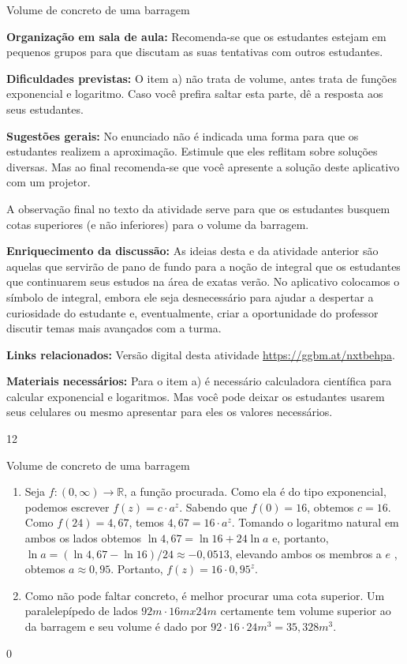 \begin{sugestions}{Volume de concreto de uma barragem}
{
\textbf{Organização em sala de aula:} Recomenda-se que os estudantes estejam em pequenos grupos para que discutam as suas tentativas com outros estudantes.

\textbf{Dificuldades previstas:} O item a) não trata de volume, antes trata de funções exponencial e logaritmo. Caso você prefira saltar esta parte, dê a resposta aos seus estudantes.

\textbf{Sugestões gerais:} No enunciado não é indicada uma forma para que os estudantes realizem a aproximação. Estimule que eles reflitam sobre soluções diversas. Mas ao final recomenda-se que você apresente a solução deste aplicativo com um projetor.

A observação final no texto da atividade serve para que os estudantes busquem cotas superiores (e não inferiores) para o volume da barragem.

\textbf{Enriquecimento da discussão:} As ideias desta e da atividade anterior são aquelas que servirão de pano de fundo para a noção de integral que os estudantes que continuarem seus estudos na área de exatas verão. No aplicativo colocamos o símbolo de integral, embora ele seja desnecessário para ajudar a despertar a curiosidade do estudante e, eventualmente, criar a oportunidade do professor discutir temas mais avançados com a turma.

\textbf{Links relacionados:} Versão digital desta atividade \url{https://ggbm.at/nxtbehpa}.

\textbf{Materiais necessários:} Para o item a) é necessário calculadora científica para calcular exponencial e logaritmos. Mas você pode deixar os estudantes usarem seus celulares ou mesmo apresentar para eles os valores necessários.
}{1}{2}
\end{sugestions}
\begin{answer}{Volume de concreto de uma barragem}
{
\begin{enumerate}
\item {} 
Seja \(f: (0, \infty) \to \mathbb{R}\), a função procurada. Como ela é do tipo exponencial, podemos escrever \(f(z) = c \cdot a^z\). Sabendo que \(f(0) = 16\), obtemos \(c = 16\). Como \(f(24) = 4,67\), temos \(4,67 = 16 \cdot a^z\). Tomando o logaritmo natural em ambos os lados obtemos \(\ln 4,67 = \ln 16 + 24 \ln a\) e, portanto, \(\ln a = (\ln 4,67 - \ln 16)/24 \approx  -0,0513\), elevando ambos os membros a  \(e\) , obtemos \(a \approx 0,95\). Portanto,  \(f(z) = 16 \cdot 0,95^z\).

\item {} 
Como não pode faltar concreto, é melhor procurar uma cota superior. Um paralelepípedo de lados \(92m \cdot 16m x 24m\) certamente tem volume superior ao da barragem e seu volume é dado por \(92 \cdot 16 \cdot 24m^3 = 35,328m^3\).

\end{enumerate}
}{0}
\end{answer}

